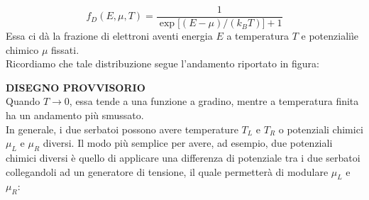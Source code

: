 \begin{equation}
    f_D(E,\mu,T)
    = \frac{1}{\exp \bigl[ (E - \mu)/(k_B T) \bigr] + 1}
    \label{eq:distribuzione_Fermi-Dirac}
\end{equation}
Essa ci dà la frazione di elettroni aventi energia $E$ a temperatura $T$ e potenzialiìe chimico $\mu$ fissati.\\
Ricordiamo che tale distribuzione segue l'andamento riportato in figura:
\begin{figure}[H]
    \centering
\end{figure}
\textbf{DISEGNO PROVVISORIO}\\
Quando $T\to 0$, essa tende a una funzione a gradino, mentre a temperatura finita ha un andamento più smussato.\\
In generale, i due serbatoi possono avere temperature $T_L$ e $T_R$ o potenziali chimici $\mu_L$ e $\mu_R$ diversi. Il modo più semplice per avere, ad esempio, due potenziali chimici diversi è quello di applicare una differenza di potenziale tra i due serbatoi collegandoli ad un generatore di tensione, il quale permetterà di modulare $\mu_L$ e $\mu_R$:
